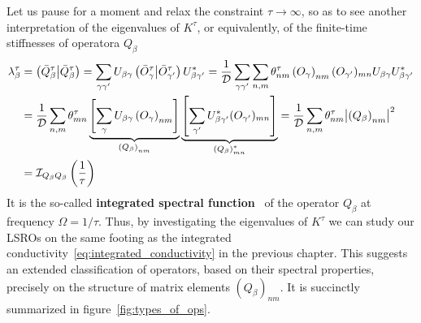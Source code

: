 Let us pause for a moment and relax the constraint \(\tau \to \infty \),
so as to see another interpretation of the eigenvalues of \(K^{\tau}\), or equivalently,
of the finite-time stiffnesses of operatora \(Q_{\beta }\) 
\begin{align}
  \lambda^{\tau}_{\beta} & = \left(\bar{Q} _{\beta}^{\tau} \middle| \bar{Q} _{\beta}^{\tau}\right) = \sum_{\gamma\gamma^{\prime}}
  U_{\beta\gamma}\left(\bar{O}^{\tau}_{\gamma} \middle| \bar{O}^{\tau}_{\gamma^{\prime}}\right){U}^{\ast}_{\beta\gamma^{\prime}}\nonumber
  = \frac{1}{\mathcal{D}} \sum_{\gamma\gamma^{\prime}}\sum_{n,m} \theta_{nm}^{\tau}
  \left(O_{\gamma}\right)_{nm} (O_{\gamma^{\prime}})_{mn} U_{\beta\gamma} {U}^{\ast}_{\beta\gamma^{\prime}}\nonumber                                                                               \\
                         & = \frac{1}{\mathcal{D}} \sum_{n,m} \theta_{mn}^{\tau} \underbrace{\left[\sum_{\gamma}U_{\beta\gamma} \left(O_{\gamma}\right)_{nm}\right]}_{\left(Q_{\beta}\right)_{nm}}
  \underbrace{\left[\sum_{\gamma^{\prime}}{U}^{\ast}_{\beta\gamma^{\prime}} (O_{\gamma^{\prime}})_{mn}\right]}_{\left(Q_{\beta}\right)^{\ast}_{mn}}
  = \frac{1}{\mathcal{D}} \sum_{n,m} \theta_{nm}^{\tau} \abs{\left(Q_{\beta}\right)_{nm}}^2\nonumber                                                                                               \\
                         & = \mathcal{I}_{Q_{\beta}Q_{\beta}}\left(\frac{1}{\tau}\right)
\end{align}
It is the so-called \textbf{integrated spectral function}~\autocite{Vidmar2021} of the operator \(Q_{\beta}\) at frequency \(\Omega = 1/\tau\).
Thus, by investigating the eigenvalues of \(K^{\tau}\) we can study our LSROs on the same footing as the integrated
conductivity~\eqref{eq:integrated_conductivity} in the previous chapter. This suggests an extended classification of operators, based on their
spectral properties, precisely on the structure of matrix elements \(\left(Q_{\beta}\right)_{nm}\). It is succinctly
summarized in figure~\ref{fig:types_of_ops}.
